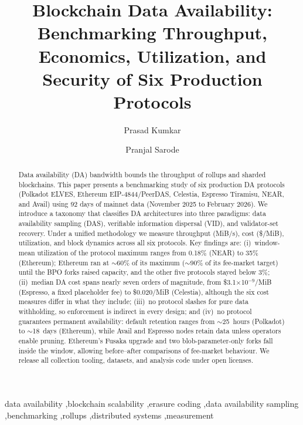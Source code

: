 \documentclass[5p,times,twocolumn,final]{elsarticle}
\newif\ifanonymous
\begin{document}
\begin{frontmatter}

\title{Blockchain Data Availability: Benchmarking Throughput, Economics, Utilization, and Security of Six Production Protocols}

\ifanonymous
\author{Anonymous}
\else
\author[cs]{Prasad Kumkar}
\author[cs]{Pranjal Sarode}
\fi

\begin{abstract}
Data availability (DA) bandwidth bounds the throughput of rollups and sharded blockchains.
This paper presents a benchmarking study of six production DA protocols (Polkadot ELVES, Ethereum EIP-4844/PeerDAS, Celestia, Espresso Tiramisu, NEAR, and Avail) using 92 days of mainnet data (November 2025 to February 2026).
We introduce a taxonomy that classifies DA architectures into three paradigms: data availability sampling (DAS), verifiable information dispersal (VID), and validator-set recovery.
Under a unified methodology we measure throughput (MiB/s), cost (\$/MiB), utilization, and block dynamics across all six protocols.
Key findings are: (i)~window-mean utilization of the protocol maximum ranges from 0.18\% (NEAR) to 35\% (Ethereum); Ethereum ran at $\sim$60\% of its maximum ($\sim$90\% of its fee-market target) until the BPO forks raised capacity, and the other five protocols stayed below 3\%; (ii)~median DA cost spans nearly seven orders of magnitude, from \$3.1$\times$10$^{-9}$/MiB (Espresso, a fixed placeholder fee) to \$0.020/MiB (Celestia), although the six cost measures differ in what they include; (iii)~no protocol slashes for pure data withholding, so enforcement is indirect in every design; and (iv)~no protocol guarantees permanent availability: default retention ranges from $\sim$25~hours (Polkadot) to $\sim$18~days (Ethereum), while Avail and Espresso nodes retain data unless operators enable pruning.
Ethereum's Fusaka upgrade and two blob-parameter-only forks fall inside the window, allowing before--after comparisons of fee-market behaviour.
We release all collection tooling, datasets, and analysis code under open licenses.
\end{abstract}

\begin{keyword}
data availability \sep blockchain scalability \sep erasure coding \sep data availability sampling \sep benchmarking \sep rollups \sep distributed systems \sep measurement
\end{keyword}

\end{frontmatter}
\end{document}
